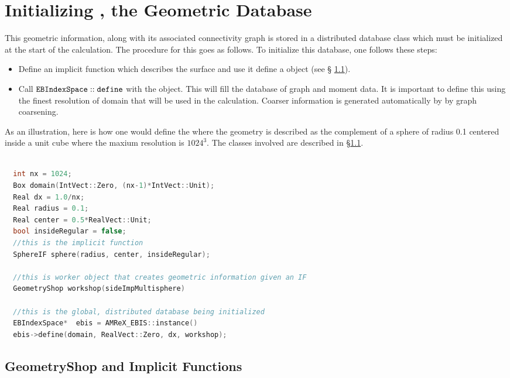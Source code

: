 \section{Initializing \ebis, the Geometric Database}
\label{sec:EB:ebinit}

This geometric information, along with its associated connectivity
graph is stored in a distributed database class \ebis which must be
initialized at the start of the calculation.    The procedure for this
goes as follows.   To initialize this database, one follows these steps:
\begin{itemize}
\item Define an implicit function which describes the surface 
      and use it define a \geom object (see \S
      \ref{sec:EB:geometryshop}).
\item Call $\tt{EBIndexSpace::define}$ with the \geom object.   This
  will fill the database of graph and moment data.   It is important
  to define this using the finest resolution of domain that will be
  used in the calculation.   Coarser information is generated
  automatically by \ebis by graph coarsening.
\end{itemize}
As an illustration, here is how one would define the \ebis where the
geometry is described as the complement of a sphere of radius 0.1
centered inside a unit cube where the maxium resolution is $1024^3$.
The classes involved are described in \S \ref{sec:EB:geometryshop}.

\begin{lstlisting}[language=cpp]

  int nx = 1024;
  Box domain(IntVect::Zero, (nx-1)*IntVect::Unit);
  Real dx = 1.0/nx;
  Real radius = 0.1;
  Real center = 0.5*RealVect::Unit;
  bool insideRegular = false;
  //this is the implicit function
  SphereIF sphere(radius, center, insideRegular);

  //this is worker object that creates geometric information given an IF
  GeometryShop workshop(sideImpMultisphere)

  //this is the global, distributed database being initialized
  EBIndexSpace*  ebis = AMReX_EBIS::instance()
  ebis->define(domain, RealVect::Zero, dx, workshop);

\end{lstlisting}


\subsection{GeometryShop and Implicit Functions}
\label{sec:EB:geometryshop}

